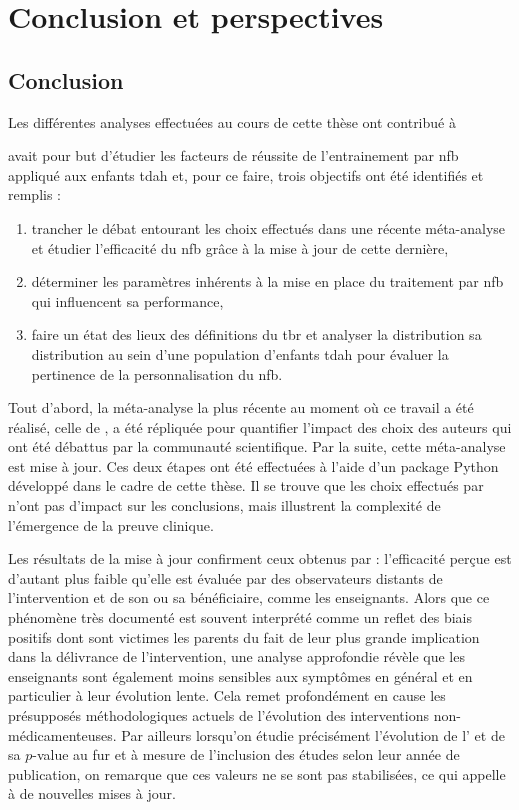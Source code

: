 \chapter{Conclusion et perspectives} \label{chapitre-5}

\section{Conclusion}

Les différentes analyses effectuées au cours de cette thèse ont contribué à 


avait pour but d'étudier les facteurs de réussite de l'entrainement par \gls{nfb} appliqué aux enfants \gls{tdah} et, 
pour ce faire, trois objectifs ont été identifiés et remplis :
\begin{enumerate}
\item trancher le débat entourant les choix effectués dans une récente méta-analyse et étudier l'efficacité du \gls{nfb} grâce à la 
mise à jour de cette dernière,
\item déterminer les paramètres inhérents à la mise en place du traitement par \gls{nfb} qui influencent sa performance,
\item faire un état des lieux des définitions du \gls{tbr} et analyser la distribution sa distribution au sein d'une population 
d'enfants \gls{tdah} pour évaluer la pertinence de la personnalisation du \gls{nfb}.
\end{enumerate}

Tout d'abord, la méta-analyse la plus récente au moment où ce travail a été réalisé, celle de \citet{Cortese2016}, a été répliquée 
pour quantifier l'impact des choix des auteurs qui ont été débattus par la communauté scientifique. Par la suite, cette méta-analyse est 
mise à jour. Ces deux étapes ont été effectuées à l'aide d'un package Python développé 
dans le cadre de cette thèse. Il se trouve que les choix effectués par \citet{Cortese2016} n'ont pas d'impact sur les conclusions, 
mais illustrent la complexité de l'émergence de la preuve clinique.

Les résultats de la mise à jour confirment ceux obtenus par \citet{Cortese2016} : 
l'efficacité perçue est d'autant plus faible qu'elle est évaluée par 
des observateurs distants de l'intervention et de son ou sa bénéficiaire, comme les enseignants. Alors que ce phénomène très documenté est souvent 
interprété comme un reflet des biais positifs dont sont victimes les parents du fait de leur plus grande implication dans la délivrance de 
l'intervention, une analyse approfondie révèle que les enseignants sont également moins sensibles aux symptômes en général et en particulier à leur évolution lente. 
Cela remet profondément en cause les présupposés méthodologiques actuels de l'évolution des interventions non-médicamenteuses. Par ailleurs
lorsqu'on étudie précisément l'évolution de l' et de sa $p$-value au fur et à mesure de l'inclusion des études selon leur année de publication, on remarque que ces valeurs ne se sont pas 
stabilisées, ce qui appelle à de nouvelles mises à jour.

